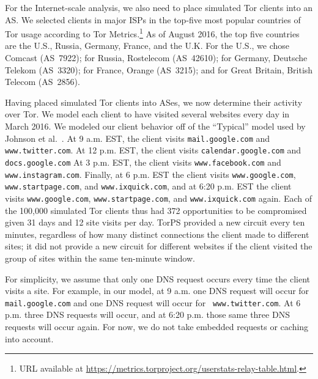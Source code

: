For the Internet-scale analysis, we also need to place simulated Tor clients
into an AS.  We selected clients in major ISPs in the top-five most popular
countries of Tor usage according to Tor Metrics.\footnote{URL available at
\url{https://metrics.torproject.org/userstats-relay-table.html}.} As of August
2016, the top five countries are the U.S., Russia, Germany, France, and the U.K.
For the U.S., we chose Comcast (AS~7922); for Russia, Rostelecom (AS~42610); for
Germany, Deutsche Telekom (AS~3320); for France, Orange (AS~3215); and for Great
Britain, British Telecom (AS~2856).

Having placed simulated Tor clients into ASes, we now determine their activity
over Tor.  We model each client to have visited several websites every day in March 2016.  We
modeled our client behavior off of the ``Typical'' model used
by Johnson et al.~\cite[\S~5.1.2]{Johnson2013a}.  At 9 a.m. EST, the client visits
{\tt mail.google.com} and {\tt www.twitter.com}.  At 12 p.m. EST, the client visits
{\tt calendar.google.com} and {\tt docs.google.com} 
At 3 p.m. EST, the client visits {\tt www.facebook.com} and {\tt www.instagram.com}. 
Finally, at 6 p.m. EST the client 
visits {\tt www.google.com}, {\tt www.startpage.com}, and {\tt www.ixquick.com}, 
and at 6:20 p.m. EST the client visits {\tt www.google.com}, {\tt www.startpage.com}, 
and {\tt www.ixquick.com} again. Each of the 100,000 simulated Tor clients thus
had 372 opportunities to be compromised given 31 days and 12 site visits per
day.  TorPS provided a new circuit every ten minutes, regardless of how many
distinct connections the client made to different sites; it did not provide a
new circuit for different websites if the client visited the group of sites
within the same ten-minute window.

For simplicity, we assume that only one DNS request occurs every time the client
visits a site. For example, in our model, at 9 a.m. one DNS request will occur
for {\tt mail.google.com} and one DNS request will occur for {\tt
www.twitter.com}. At 6 p.m. three DNS requests will occur, and at 6:20 p.m.
those same three DNS requests will occur again.   For now, we do
not take embedded requests or caching into account.

